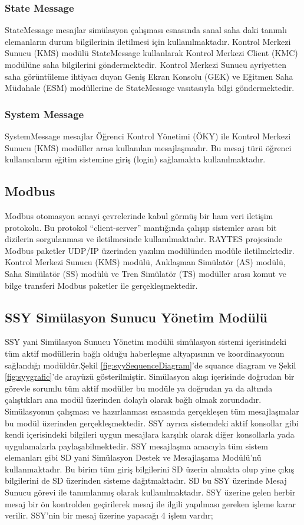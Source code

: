 \documentclass[conference]{IEEEtran}
\begin{document}
\subsubsection{State Message}

StateMessage mesajlar simülasyon çalışması esnasında sanal saha daki tanımlı elemanların durum bilgilerinin iletilmesi için kullanılmaktadır. Kontrol Merkezi Sunucu (KMS) modülü StateMessage kullanlarak Kontrol Merkezi Client (KMC) modülüne saha bilgilerini göndermektedir. Kontrol Merkezi Sunucu ayriyetten saha görüntüleme ihtiyacı duyan Geniş Ekran Konsolu (GEK) ve Eğitmen Saha Müdahale (ESM) modüllerine de StateMessage vasıtasıyla bilgi göndermektedir.

\subsubsection{System Message}
SystemMessage mesajlar Öğrenci Kontrol Yönetimi (ÖKY) ile Kontrol Merkezi Sunucu (KMS) modüller arası kullanılan mesajlaşmadır. Bu mesaj türü öğrenci kullanıcıların eğitim sistemine giriş (login) sağlamakta kullanılmaktadır.

\subsection{Modbus}
Modbus otomasyon senayi çevrelerinde kabul görmüş bir ham veri iletişim protokolu. Bu protokol “client-server” mantığında çalışıp sistemler arası bit dizilerin sorgulanması ve iletilmesinde kullanılmaktadır. RAYTES projesinde Modbus paketler UDP/IP üzerinden yazılım modülünden modüle iletilmektedir. Kontrol Merkezi Sunucu (KMS) modülü, Anklaşman Simülatör (AS) modülü, Saha Simülatör (SS) modülü ve Tren Simülatör (TS) modüller arası komut ve bilge transferi Modbus paketler ile gerçekleşmektedir.


\subsection{SSY Simülasyon Sunucu Yönetim Modülü}
SSY yani Simülasyon Sunucu Yönetim modülü simülasyon sistemi içerisindeki tüm aktif modüllerin bağlı olduğu  haberleşme altyapısının ve koordinasyonun sağlandığı modüldür.Şekil \ref{fig:syySequenceDiagram}'de squance diagram ve  Şekil \ref{fig:syygrafic}'de arayüzü gösterilmiştir.
Simülasyon akışı içerisinde doğrudan bir görevle sorumlu tüm aktif modüller bu modüle ya doğrudan ya da altında çalıştıkları ana modül üzerinden dolaylı olarak bağlı olmak zorundadır. Simülasyonun çalışması ve hazırlanması esnasında gerçekleşen tüm mesajlaşmalar bu modül üzerinden gerçekleşmektedir.
SSY ayrıca sistemdeki aktif konsollar gibi kendi içerisindeki bilgileri uygun mesajlara karşılık olarak diğer konsollarla yada uygulamalarla paylaşabilmektedir.
SSY mesajlaşma amacıyla tüm sistem elemanları gibi SD yani Simülasyon Destek ve Mesajlaşama Modülü’nü kullanmaktadır. Bu birim tüm giriş bilgilerini SD üzerin almakta olup yine çıkış bilgilerini de SD üzerinden sisteme dağıtmaktadır. SD bu SSY üzerinde Mesaj Sunucu görevi ile tanımlanmış olarak kullanılmaktadır.
SSY üzerine gelen herbir mesaj bir ön kontrolden geçirilerek mesaj ile ilgili yapılması gereken işleme karar verilir. SSY’nin bir mesaj üzerine yapacağı 4 işlem vardır;
\end{document}
